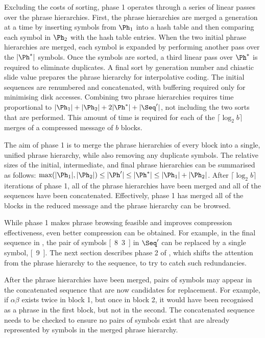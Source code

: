 Excluding the costs of sorting, phase 1 operates through a 
series of linear passes over the phrase hierarchies.  First,
the phrase hierarchies are merged a generation at a time by
inserting symbols from $\Ph_1$ into a hash table and then 
comparing each symbol in $\Ph_2$ with the hash table entries.
When the two initial phrase hierarchies are merged, each symbol
is expanded by performing another pass over the $|\Ph^*|$ 
symbols.  Once the symbols are
sorted, a third linear pass over $\Ph^*$ is required to 
eliminate duplicates.  A final sort by generation number 
and chiastic slide value prepares the phrase
hierarchy for interpolative coding.  The initial sequences are 
renumbered and concatenated, with
buffering  required only for minimising disk accesses.
Combining two phrase hierarchies requires time proportional to
$|\Ph_1| + |\Ph_2| + 2|\Ph^*| + |\Seq'|$, not including the two
sorts that are performed.  This amount of time is required
for each of the $\lceil \log_2 b \rceil$ merges of a compressed
message of $b$ blocks.

The aim of phase 1 is to merge the phrase
hierarchies of every block into a single, unified phrase
hierarchy, while also removing any duplicate symbols.  
The relative sizes of the initial, intermediate,
and final phrase hierarchies can be summarised as follows:
$\text{max}(|\Ph_1|, |\Ph_2|) \leq |\Ph'| \leq |\Ph^*| \leq |\Ph_1| + |\Ph_2|$.
After $\lceil \log_2 b \rceil$ iterations of phase 1,
all of the phrase hierarchies have been merged and
all of the sequences have been concatenated.  Effectively, 
phase 1 has merged all of the blocks in the reduced message 
and the phrase hierarchy can be browsed.

While phase 1 makes phrase browsing feasible and
improves compression effectiveness, even better 
compression can be obtained.  For example, in the final sequence 
in , the pair
of symbols [~8~3~] in $\Seq'$ can be replaced by a single symbol, [~9~].  
The next section describes phase 2 of \remerge, which 
shifts the attention from the phrase hierarchy to the 
sequence, to try to catch such redundancies.


After the phrase hierarchies have been merged, pairs of 
symbols may appear in the concatenated 
sequence that are now candidates for replacement.  For example,
if $\alpha$$\beta$ exists twice in block 1, but once in
block 2, it would have been recognised as a phrase in the first block,
but not in the second.
The concatenated sequence needs to be checked to ensure
no pairs of symbols exist that are already represented by
symbols in the merged phrase hierarchy.

